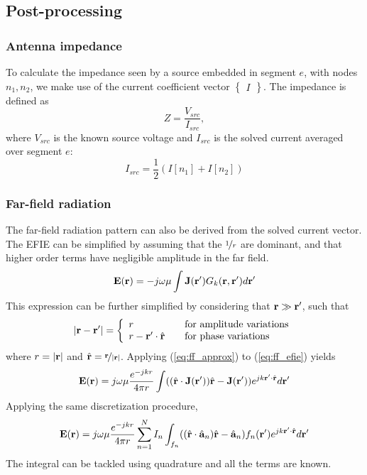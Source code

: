 \subsection{Post-processing}

\subsubsection{Antenna impedance}
To calculate the impedance seen by a source embedded in segment $e$, with nodes $n_1, n_2$, we make use of the current coefficient vector $\begin{Bmatrix}
	I
\end{Bmatrix}$. The impedance is defined as
\begin{equation}
	Z = \frac{V_{src}}{I_{src}},
\end{equation}
where $V_{src}$ is the known source voltage and $I_{src}$ is the solved current averaged over segment $e$:
\begin{equation*}
	I_{src} = \frac{1}{2}\left( I[n_1] + I[n_2] \right)
\end{equation*}

\subsubsection{Far-field radiation}
The far-field radiation pattern can also be derived from the solved current vector. The EFIE can be simplified by assuming that the $\nicefrac{1}{r}$ are dominant, and that higher order terms have negligible amplitude in the far field.
\begin{equation}
	\mathbf{E}(\mathbf{r}) = -j\omega\mu \int \mathbf{J}(\mathbf{r}^\prime) G_k(\mathbf{r}, \mathbf{r}^\prime) d\mathbf{r}^\prime
	\label{eq:ff_efie}
\end{equation}
This expression can be further simplified by considering that $\mathbf{r} \gg \mathbf{r}^\prime$, such that
\begin{equation}
	|\mathbf{r} - \mathbf{r}^\prime| = \left\{ \begin{array}{ll}
		r \quad & \text{for amplitude variations} \\
		r - \mathbf{r}^\prime \cdot \hat{\mathbf{r}} \quad & \text{for phase variations}
	\end{array} \right.
	\label{eq:ff_approx}
\end{equation}
where $r = |\mathbf{r}|$ and $\hat{\mathbf{r}} = \nicefrac{\mathbf{r}}{|\mathbf{r}|}$. Applying (\ref{eq:ff_approx}) to (\ref{eq:ff_efie}) yields
\begin{equation}
	\mathbf{E}(\mathbf{r}) = j\omega\mu \frac{e^{-j k r}}{4\pi r} \int ((\hat{\mathbf{r}} \cdot \mathbf{J}(\mathbf{r}^\prime)) \hat{\mathbf{r}} - \mathbf{J}(\mathbf{r}^\prime)) e^{j k \mathbf{r}^\prime \cdot \hat{\mathbf{r}}} d\mathbf{r}^\prime
\end{equation}
Applying the same discretization procedure,
\begin{equation}
	\mathbf{E}(\mathbf{r}) = j\omega\mu \frac{e^{-j k r}}{4\pi r} \sum_{n = 1}^{N} I_n \int_{f_n} ((\hat{\mathbf{r}} \cdot \hat{\mathbf{a}}_n) \hat{\mathbf{r}} - \hat{\mathbf{a}}_n) f_n(\mathbf{r}^\prime) e^{j k \mathbf{r}^\prime \cdot \hat{\mathbf{r}}} d\mathbf{r}^\prime
\end{equation}
The integral can be tackled using quadrature and all the terms are known.